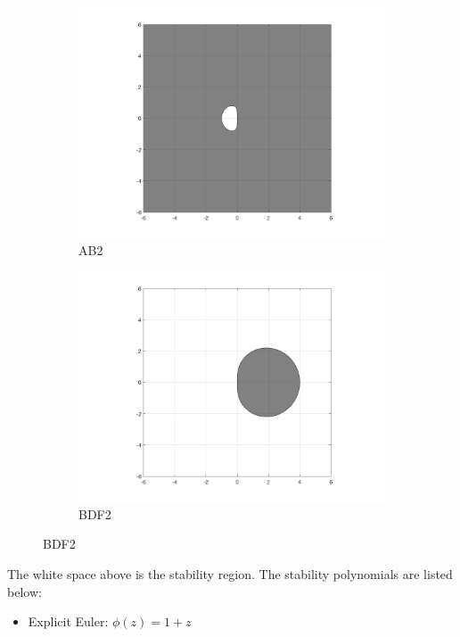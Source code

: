 \documentclass[10pt]{report}
\begin{document}
\begin{enumerate}
\begin{figure}[ht]
\begin{subfigure}[b]{0.25\linewidth}
			\includegraphics[width=\linewidth]{AB2.png} 
			\vspace{-5ex}
			\caption*{AB2}
		\end{subfigure}%
		\begin{subfigure}[b]{0.25\linewidth}
			\centering
			\includegraphics[width=\linewidth]{BDF2.png} 
			\vspace{-5ex}
			\caption*{BDF2}
		\end{subfigure} 
	\end{figure}
	The white space above is the stability region. The stability polynomials are listed below:
	\begin{itemize}
		\item 
		Explicit Euler: $\phi(z) = 1 + z$

\end{itemize}
\end{enumerate}
\end{document}
